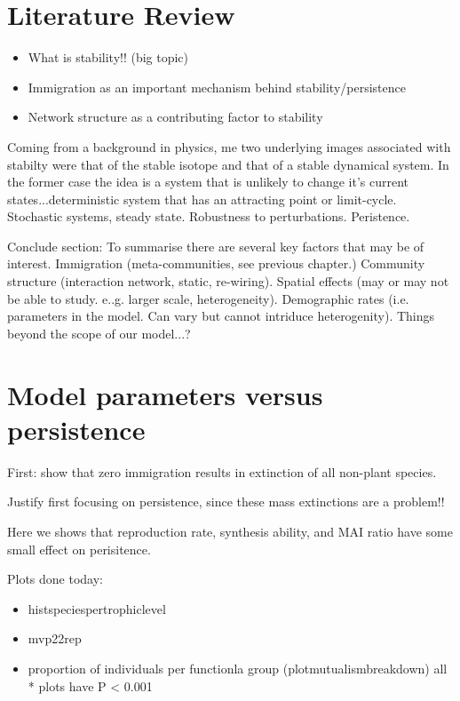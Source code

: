 \section{Literature Review}
\label{sec:lit_review_stability}

\begin{itemize}

\item What is stability!! (big topic)

\item Immigration as an important mechanism behind stability/persistence

\item Network structure as a contributing factor to stability

\end{itemize}


Coming from a background in physics, me two underlying images associated with stabilty were that of the stable isotope and that of a stable dynamical system. In the former case the idea is a system that is unlikely to change it's current states...deterministic system that has an attracting point or limit-cycle. Stochastic systems, steady state. Robustness to perturbations. Peristence. 


Conclude section: To summarise there are several key factors that may be of interest. Immigration (meta-communities, see previous chapter.) Community structure (interaction network, static, re-wiring). Spatial effects (may or may not be able to study. e..g. larger scale, heterogeneity).  Demographic rates (i.e. parameters in the model. Can vary but cannot intriduce heterogenity). Things beyond the scope of our model...?


\section{Model parameters versus persistence}

First: show that zero immigration results in extinction of all non-plant species.

Justify first focusing on persistence, since these mass extinctions are a problem!!

Here we shows that reproduction rate, synthesis ability, and MAI ratio have some small effect on perisitence. 

Plots done today:
\begin{itemize}
\item histspeciespertrophiclevel
\item mvp22rep
\item proportion of individuals per functionla group (plotmutualismbreakdown) all * plots have P < 0.001
\end{itemize}

